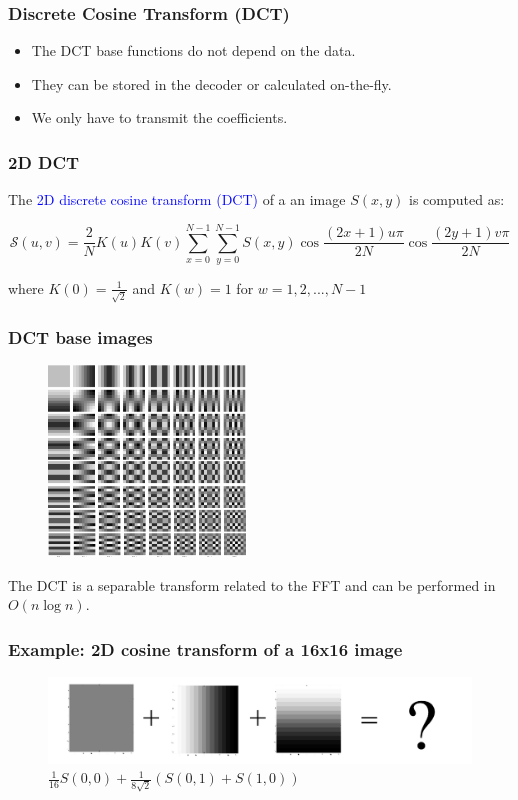 \documentclass{beamer}
\begin{document}
\begin{frame}
\frametitle{Discrete Cosine Transform (DCT)}

\begin{itemize}
\addtolength{\itemsep}{-2pt}
\item The DCT base functions do not depend on the data. 
\item They can be stored in the decoder or calculated on-the-fly.
\item We only have to transmit the coefficients.
\end{itemize}

\end{frame}



\begin{frame}
  \frametitle{2D DCT}

\begin{flushleft}
  \normalsize{The {\textcolor{blue}{2D discrete cosine transform (DCT)}} of a
    an image $S(x,y)$ is computed as:}
  \scriptsize

\[
\mathcal{S}(u,v) =
\frac{2}{N}K(u)K(v)\sum\limits_{x=0}^{N-1}\sum\limits_{y=0}^{N-1}
S(x,y)\cos\frac{(2x+1)u\pi}{2N} \cos\frac{(2y+1)v\pi}{2N}
\]
\end{flushleft}
where $K(0) = \frac{1}{\sqrt{2}}$ and $K(w) = 1$ for $w = 1,2,...,N-1$
\end{frame}



\begin{frame}
\frametitle{DCT base images}
\begin{figure}
\centering
\includegraphics[width=0.47\textwidth]{dct}
\end{figure}
The DCT is a separable transform related to the FFT and can be performed in $O(n\log n)$.

\end{frame}


\begin{frame}
\frametitle{Example: 2D cosine transform of a 16x16 image}
\begin{figure}[H]
  \includegraphics[width=  \textwidth]{Ex_BasisImages1} 
  \caption{$\frac{1}{16}S(0,0) + \frac{1}{8 \sqrt{2}}(S(0,1) + S(1,0))$}
\end{figure} 
\end{frame}
\end{document}
